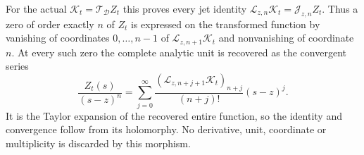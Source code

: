 For the actual $\mathcal K_t=\mathcal T_{\mathcal D}Z_t$ this proves
every jet identity
$\mathcal L_{z,n}\mathcal K_t=\mathcal J_{z,n}Z_t$.
Thus a zero of order exactly $n$ of $Z_t$ is expressed on the transformed
function by vanishing of coordinates $0,\ldots,n-1$ of
$\mathcal L_{z,n+1}\mathcal K_t$ and nonvanishing of coordinate $n$.
At every such zero the complete analytic unit is recovered as the
convergent series
\[
\frac{Z_t(s)}{(s-z)^n}
 =\sum_{j=0}^\infty
 \frac{(\mathcal L_{z,n+j+1}\mathcal K_t)_{n+j}}{(n+j)!}(s-z)^j.
\]
It is the Taylor expansion of the recovered entire function, so the
identity and convergence follow from its holomorphy. No derivative,
unit, coordinate or multiplicity is discarded by this morphism.
